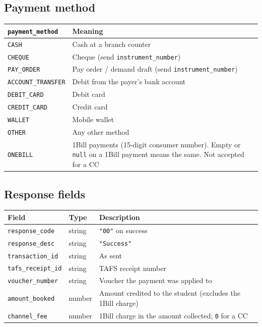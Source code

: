 \documentclass[11pt]{article}
\begin{document}
\subsection{Payment method}\label{sec:method}
\begin{center}
\begin{tabularx}{\textwidth}{@{}l L@{}}
\toprule
\texttt{payment\_method} & \textbf{Meaning} \\
\midrule
\texttt{CASH} & Cash at a branch counter \\
\texttt{CHEQUE} & Cheque (send \texttt{instrument\_number}) \\
\texttt{PAY\_ORDER} & Pay order / demand draft (send \texttt{instrument\_number}) \\
\texttt{ACCOUNT\_TRANSFER} & Debit from the payer's bank account \\
\texttt{DEBIT\_CARD} & Debit card \\
\texttt{CREDIT\_CARD} & Credit card \\
\texttt{WALLET} & Mobile wallet \\
\texttt{OTHER} & Any other method \\
\texttt{ONEBILL} & 1Bill payments (15-digit consumer number). Empty or \texttt{null} on a 1Bill payment means the same. Not accepted for a CC \\
\bottomrule
\end{tabularx}
\end{center}

\subsection{Response fields}
\begin{longtable}{@{}p{} p{} p{}@{}}
\toprule
\textbf{Field} & \textbf{Type} & \textbf{Description} \\
\midrule
\endhead
\texttt{response\_code} & string & \texttt{"00"} on success \\
\texttt{response\_desc} & string & \texttt{"Success"} \\
\texttt{transaction\_id} & string & As sent \\
\texttt{tafs\_receipt\_id} & string & TAFS receipt number \\
\texttt{voucher\_number} & string & Voucher the payment was applied to \\
\texttt{amount\_booked} & number & Amount credited to the student (excludes the 1Bill charge) \\
\texttt{channel\_fee} & number & 1Bill charge in the amount collected; \texttt{0} for a CC \\
\bottomrule
\end{longtable}
\end{document}
